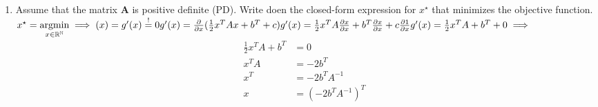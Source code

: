 \begin{enumerate}[label=(\alph*)]
\item Assume that the matrix \textbf{A} is positive definite (PD). Write doen the closed-form expression for $x^\star$ that minimizes the objective function.
	\subitem $x^\star = \underset{x\in \mathbb{R^{N}}}{\operatorname{argmin}} \implies (x)=g^{\prime}(x)\stackrel{!}{=}0 \\ g^{\prime}(x)= \frac{\partial }{\partial x}(\frac{1}{2} x^{T}Ax + b^{T} + c) \\ g^{\prime}(x)= \frac{1}{2}x^{T}A \frac{\partial x}{\partial x} + b^{T} \frac{\partial x}{\partial x} + c \frac{\partial 1}{\partial x} \\ g^{\prime}(x) = \frac{1}{2}x^{T}A+b^{T} + 0 \implies \\ $\begin{align*} \frac{1}{2}x^{T}A + b^{T} &= 0 \\ x^{T}A &= -2b^{T} \\ x^{T} &= -2b^{T}A^{-1} \\ x &= (-2b^{T}A^{-1})^{T} \end{align*}
\end{enumerate}







